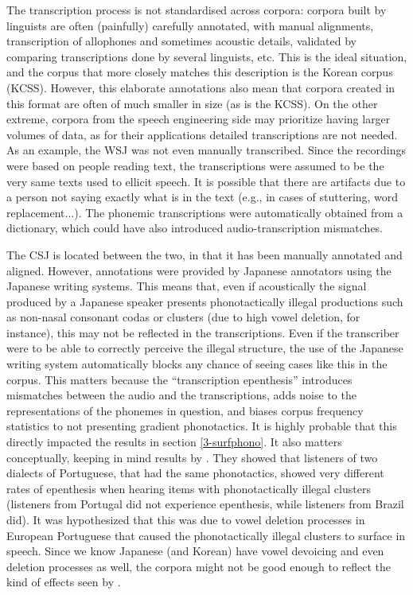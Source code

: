 {The transcription process is not standardised across corpora: corpora built by linguists are often (painfully) carefully annotated, with manual alignments, transcription of allophones and sometimes acoustic details, validated by comparing transcriptions done by several linguists, etc. This is the ideal situation, and the corpus that more closely matches this description is the Korean corpus (KCSS). However, this elaborate annotations also mean that corpora created in this format are often of much smaller in size (as is the KCSS). On the other extreme, corpora from the speech engineering side may prioritize having larger volumes of data, as for their applications detailed transcriptions are not needed. As an example, the WSJ was not even manually transcribed. Since the recordings were based on people reading text, the transcriptions were assumed to be the very same texts used to ellicit speech. It is possible that there are artifacts due to a person not saying exactly what is in the text (e.g., in cases of stuttering, word replacement...). The phonemic transcriptions were automatically obtained from a dictionary, which could have also introduced audio-transcription mismatches.

The CSJ is located between the two, in that it has been manually annotated and aligned. However, annotations were provided by Japanese annotators using the Japanese writing systems. This means that, even if acoustically the signal produced by a Japanese speaker presents phonotactically illegal productions such as non-nasal consonant codas or clusters (due to high vowel deletion, for instance), this may not be reflected in the transcriptions. Even if the transcriber were to be able to correctly perceive the illegal structure, the use of the Japanese writing system automatically blocks any chance of seeing cases like this in the corpus. This matters because the ``transcription epenthesis'' introduces mismatches between the audio and the transcriptions, adds noise to the representations of the phonemes in question, and biases corpus frequency statistics to not presenting gradient phonotactics. It is highly probable that this directly impacted the results in section \ref{3-surfphono}. It also matters conceptually, keeping in mind results by \cite{dupoux2011}. They showed that listeners of two dialects of Portuguese, that had the same phonotactics, showed very different rates of epenthesis when hearing items with phonotactically illegal clusters (listeners from Portugal did not experience epenthesis, while listeners from Brazil did). It was hypothesized that this was due to vowel deletion processes in European Portuguese that caused the phonotactically illegal clusters to surface in speech. Since we know Japanese (and Korean) have vowel devoicing and even deletion processes as well, the corpora might not be good enough to reflect the kind of effects seen by \cite{dupoux2011}.

}
